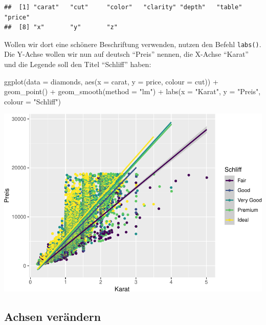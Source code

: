 \documentclass[
]{book}
\newenvironment{Shaded}{\begin{snugshade}}{\end{snugshade}}
\newcommand{\AttributeTok}[1]{\textcolor[rgb]{0.77,0.63,0.00}{#1}}
\newcommand{\FunctionTok}[1]{\textcolor[rgb]{0.00,0.00,0.00}{#1}}
\newcommand{\NormalTok}[1]{#1}
\newcommand{\SpecialCharTok}[1]{\textcolor[rgb]{0.00,0.00,0.00}{#1}}
\newcommand{\StringTok}[1]{\textcolor[rgb]{0.31,0.60,0.02}{#1}}
\begin{document}
\begin{verbatim}
##  [1] "carat"   "cut"     "color"   "clarity" "depth"   "table"   "price"  
##  [8] "x"       "y"       "z"
\end{verbatim}

Wollen wir dort eine schönere Beschriftung verwenden, nutzen den Befehl \texttt{labs()}. Die Y-Achse wollen wir nun auf deutsch ``Preis'' nennen, die X-Achse ``Karat'' und die Legende soll den Titel ``Schliff'' haben:

\begin{Shaded}
\begin{Highlighting}[]
\FunctionTok{ggplot}\NormalTok{(}\AttributeTok{data =}\NormalTok{ diamonds, }\FunctionTok{aes}\NormalTok{(}\AttributeTok{x =}\NormalTok{ carat, }\AttributeTok{y =}\NormalTok{ price, }\AttributeTok{colour =}\NormalTok{ cut)) }\SpecialCharTok{+}
  \FunctionTok{geom\_point}\NormalTok{() }\SpecialCharTok{+}
  \FunctionTok{geom\_smooth}\NormalTok{(}\AttributeTok{method =} \StringTok{"lm"}\NormalTok{) }\SpecialCharTok{+}
  \FunctionTok{labs}\NormalTok{(}\AttributeTok{x =} \StringTok{"Karat"}\NormalTok{, }\AttributeTok{y =} \StringTok{"Preis"}\NormalTok{, }\AttributeTok{colour =} \StringTok{"Schliff"}\NormalTok{)}
\end{Highlighting}
\end{Shaded}

\includegraphics{CFH_R_bookdown_files/figure-latex/unnamed-chunk-175-1.pdf}

\hypertarget{achsen-veruxe4ndern}{%
\subsection{Achsen verändern}\label{achsen-veruxe4ndern}}
\end{document}
